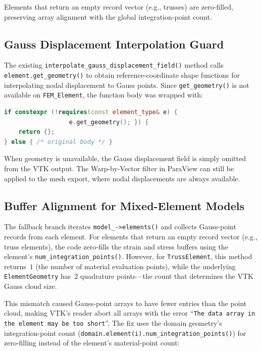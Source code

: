 Elements that return an empty record vector (e.g., trusses) are
zero-filled, preserving array alignment with the global integration-point
count.

\subsection{Gauss Displacement Interpolation Guard}

The existing \texttt{interpolate\_gauss\_displacement\_field()} method
calls \texttt{element.get\_geometry()} to obtain reference-coordinate
shape functions for interpolating nodal displacement to Gauss points.
Since \texttt{get\_geometry()} is not available on \texttt{FEM\_Element},
the function body was wrapped with:

\begin{lstlisting}[language=C++, basicstyle=\ttfamily\small]
if constexpr (!requires(const element_type& e) {
                  e.get_geometry(); }) {
    return {};
} else { /* original body */ }
\end{lstlisting}

When geometry is unavailable, the Gauss displacement field is simply
omitted from the VTK output.  The Warp-by-Vector filter in ParaView
can still be applied to the mesh export, where nodal displacements
are always available.

\subsection{Buffer Alignment for Mixed-Element Models}

The fallback branch iterates \texttt{model\_->elements()} and collects
Gauss-point records from each element.  For elements that return an empty
record vector (e.g., truss elements), the code zero-fills the strain and
stress buffers using the element's \texttt{num\_integration\_points()}.
However, for \texttt{TrussElement}, this method returns~$1$ (the number
of material evaluation points), while the underlying
\texttt{ElementGeometry} has~$2$ quadrature points---the count that
determines the VTK Gauss cloud size.

This mismatch caused Gauss-point arrays to have fewer entries than the
point cloud, making VTK's reader abort all arrays with the error
``\texttt{The data array in the element may be too short}''.
The fix uses the domain geometry's integration-point count
(\texttt{domain.element(i).num\_integration\_points()}) for zero-filling
instead of the element's material-point count:

